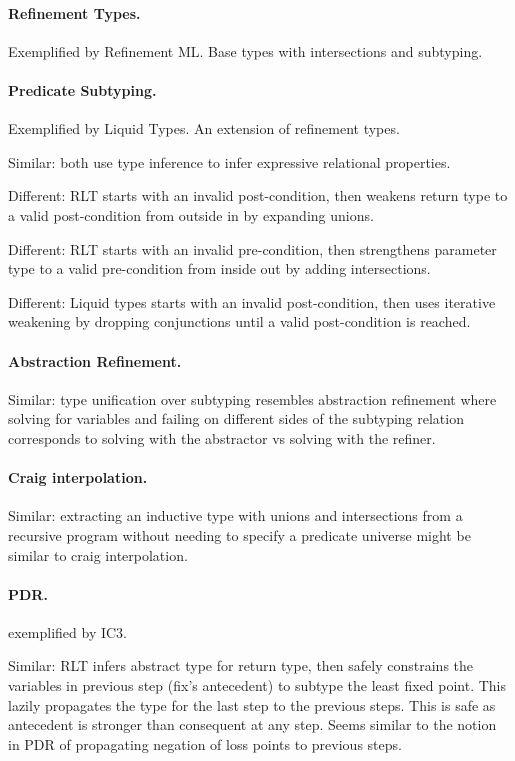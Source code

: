 \documentclass[acmsmall]{acmart}
\theoremstyle{definition}
\begin{document}
\paragraph{Refinement Types.}
Exemplified by Refinement ML. Base types with intersections and subtyping.

\paragraph{Predicate Subtyping.}
Exemplified by Liquid Types. An extension of refinement types.

Similar: both use type inference to infer expressive relational properties. 

Different: RLT starts with an invalid post-condition, then weakens return type to a valid post-condition from outside in by expanding unions.

Different: RLT starts with an invalid pre-condition, then strengthens parameter type to a valid pre-condition from inside out by adding intersections.

Different: Liquid types starts with an invalid post-condition, then uses iterative weakening by dropping conjunctions until a valid post-condition is reached.


\paragraph{Abstraction Refinement.} 
Similar: type unification over subtyping resembles abstraction refinement  
where solving for variables and failing on different sides of the subtyping relation corresponds to
solving with the abstractor vs solving with the refiner.

\paragraph{Craig interpolation.} 
Similar: extracting an inductive type with unions and intersections 
from a recursive program without needing to specify a predicate universe might be similar to
craig interpolation.

\paragraph{PDR.}
exemplified by IC3. 

Similar: RLT infers abstract type for return type, 
then safely constrains the variables in previous step (fix's antecedent) 
to subtype the least fixed point.
This lazily propagates the type for the last step to the previous steps.
This is safe as antecedent is stronger than consequent at any step.
Seems similar to the notion in PDR of propagating negation of loss points to previous steps. 
\end{document}
